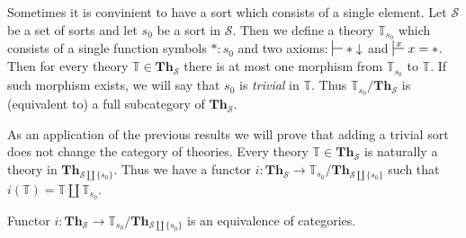 \documentclass[reqno]{amsart}
\theoremstyle{definition}
\theoremstyle{remark}
\newcommand{\cat}[1]{\mathbf{#1}}
\newcommand{\Th}{\cat{Th}}
\numberwithin{figure}{section}
\begin{document}
Sometimes it is convinient to have a sort which consists of a single element.
Let $\mathcal{S}$ be a set of sorts and let $s_0$ be a sort in $\mathcal{S}$.
Then we define a theory $\mathbb{T}_{s_0}$ which consists of a single function symbols $* : s_0$ and two axioms: $\sststile{}{} * \downarrow$ and $\sststile{}{x} x = *$.
Then for every theory $\mathbb{T} \in \Th_\mathcal{S}$ there is at most one morphism from $\mathbb{T}_{s_0}$ to $\mathbb{T}$.
If such morphism exists, we will say that $s_0$ is \emph{trivial} in $\mathbb{T}$.
Thus $\mathbb{T}_{s_0}/\Th_\mathcal{S}$ is (equivalent to) a full subcategory of $\Th_\mathcal{S}$.

As an application of the previous results we will prove that adding a trivial sort does not change the category of theories.
Every theory $\mathbb{T} \in \Th_\mathcal{S}$ is naturally a theory in $\Th_{\mathcal{S} \amalg \{ s_0 \}}$.
Thus we have a functor $i : \Th_\mathcal{S} \to \mathbb{T}_{s_0}/\Th_{\mathcal{S} \amalg \{ s_0 \}}$ such that $i(\mathbb{T}) = \mathbb{T} \amalg \mathbb{T}_{s_0}$.
\begin{prop}
Functor $i : \Th_\mathcal{S} \to \mathbb{T}_{s_0}/\Th_{\mathcal{S} \amalg \{ s_0 \}}$ is an equivalence of categories.
\end{prop}
\end{document}
